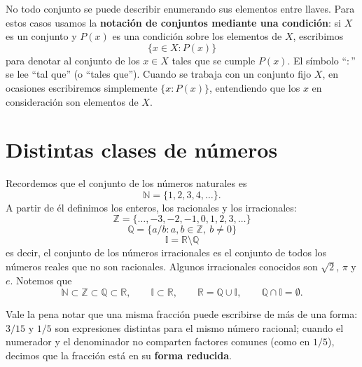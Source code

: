 \documentclass[12pt,a4paper]{book}
\begin{document}
  No todo conjunto se puede describir enumerando sus elementos entre llaves. Para estos casos usamos la \textbf{notación de conjuntos mediante una condición}: si $X$ es un conjunto y $P(x)$ es una condición sobre los elementos de $X$, escribimos
  \begin{equation*}
    \{x \in X : P(x)\}
  \end{equation*}
  para denotar al conjunto de los $x \in X$ tales que se cumple $P(x)$. El símbolo ``$:$'' se lee ``tal que'' (o ``tales que''). Cuando se trabaja con un conjunto fijo $X$, en ocasiones escribiremos simplemente $\{x : P(x)\}$, entendiendo que los $x$ en consideración son elementos de $X$.
  
  \section{Distintas clases de números}
  
  Recordemos que el conjunto de los números naturales es
  \begin{equation*}
    \mathbb{N} = \{1,2,3,4,\dots\}.
  \end{equation*}
  A partir de él definimos los enteros, los racionales y los irracionales:
  \begin{equation*}
    \mathbb{Z} = \{\dots,-3,-2,-1,0,1,2,3,\dots\}
  \end{equation*}
  \begin{equation*}
    \mathbb{Q} = \{a/b : a,b \in \mathbb{Z},\ b \neq 0\}
  \end{equation*}
  \begin{equation*}
    \mathbb{I} = \mathbb{R}\setminus\mathbb{Q}
  \end{equation*}
  es decir, el conjunto de los números irracionales es el conjunto de todos los números reales que no son racionales. Algunos irracionales conocidos son $\sqrt{2}$, $\pi$ y $e$. Notemos que
  \begin{equation*}
    \mathbb{N} \subset \mathbb{Z} \subset \mathbb{Q} \subset \mathbb{R}, \qquad \mathbb{I} \subset \mathbb{R}, \qquad \mathbb{R} = \mathbb{Q} \cup \mathbb{I}, \qquad \mathbb{Q} \cap \mathbb{I} = \emptyset.
  \end{equation*}
  
  Vale la pena notar que una misma fracción puede escribirse de más de una forma: $3/15$ y $1/5$ son expresiones distintas para el mismo número racional; cuando el numerador y el denominador no comparten factores comunes (como en $1/5$), decimos que la fracción está en su \textbf{forma reducida}.
  
\end{document}
